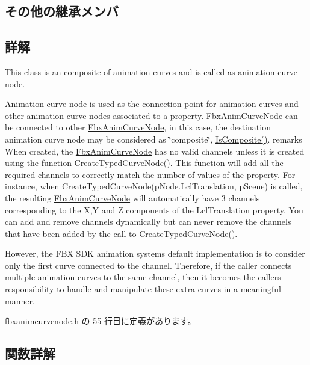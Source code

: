 \subsection*{その他の継承メンバ}


\subsection{詳解}
This class is an composite of animation curves and is called as animation curve node.

Animation curve node is used as the connection point for animation curves and other animation curve nodes associated to a property. \hyperlink{class_fbx_anim_curve_node}{Fbx\+Anim\+Curve\+Node} can be connected to other \hyperlink{class_fbx_anim_curve_node}{Fbx\+Anim\+Curve\+Node}, in this case, the destination animation curve node may be considered as \char`\"{}composite\char`\"{}, \hyperlink{class_fbx_anim_curve_node_ad0fd9df109fb4e9c8702d37f03b6cc03}{Is\+Composite()}. remarks When created, the \hyperlink{class_fbx_anim_curve_node}{Fbx\+Anim\+Curve\+Node} has no valid channels unless it is created using the function \hyperlink{class_fbx_anim_curve_node_a588814e5973e080f84c54438623ddf7e}{Create\+Typed\+Curve\+Node()}. This function will add all the required channels to correctly match the number of values of the property. For instance, when Create\+Typed\+Curve\+Node(p\+Node.\+Lcl\+Translation, p\+Scene) is called, the resulting \hyperlink{class_fbx_anim_curve_node}{Fbx\+Anim\+Curve\+Node} will automatically have 3 channels corresponding to the X,Y and Z components of the Lcl\+Translation property. You can add and remove channels dynamically but can never remove the channels that have been added by the call to \hyperlink{class_fbx_anim_curve_node_a588814e5973e080f84c54438623ddf7e}{Create\+Typed\+Curve\+Node()}.

However, the F\+BX S\+DK animation system\textquotesingle{}s default implementation is to consider only the first curve connected to the channel. Therefore, if the caller connects multiple animation curves to the same channel, then it becomes the caller\textquotesingle{}s responsibility to handle and manipulate these extra curves in a meaningful manner. 

 fbxanimcurvenode.\+h の 55 行目に定義があります。



\subsection{関数詳解}
\mbox{\label{class_fbx_anim_curve_node_a985772edb8c85825adfef69c6bd06627}} 
